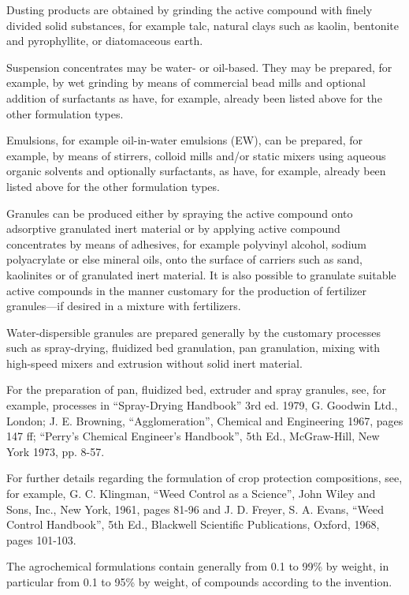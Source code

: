 \documentclass[11pt,a4paper]{article}
\begin{document}
Dusting products are obtained by grinding the active compound with finely divided solid substances, for example talc, natural clays such as kaolin, bentonite and pyrophyllite, or diatomaceous earth.

Suspension concentrates may be water- or oil-based. They may be prepared, for example, by wet grinding by means of commercial bead mills and optional addition of surfactants as have, for example, already been listed above for the other formulation types.

Emulsions, for example oil-in-water emulsions (EW), can be prepared, for example, by means of stirrers, colloid mills and/or static mixers using aqueous organic solvents and optionally surfactants, as have, for example, already been listed above for the other formulation types.

Granules can be produced either by spraying the active compound onto adsorptive granulated inert material or by applying active compound concentrates by means of adhesives, for example polyvinyl alcohol, sodium polyacrylate or else mineral oils, onto the surface of carriers such as sand, kaolinites or of granulated inert material. It is also possible to granulate suitable active compounds in the manner customary for the production of fertilizer granules—if desired in a mixture with fertilizers.

Water-dispersible granules are prepared generally by the customary processes such as spray-drying, fluidized bed granulation, pan granulation, mixing with high-speed mixers and extrusion without solid inert material.

For the preparation of pan, fluidized bed, extruder and spray granules, see, for example, processes in “Spray-Drying Handbook” 3rd ed. 1979, G. Goodwin Ltd., London; J. E. Browning, “Agglomeration”, Chemical and Engineering 1967, pages 147 ff; “Perry's Chemical Engineer's Handbook”, 5th Ed., McGraw-Hill, New York 1973, pp. 8-57.

For further details regarding the formulation of crop protection compositions, see, for example, G. C. Klingman, “Weed Control as a Science”, John Wiley and Sons, Inc., New York, 1961, pages 81-96 and J. D. Freyer, S. A. Evans, “Weed Control Handbook”, 5th Ed., Blackwell Scientific Publications, Oxford, 1968, pages 101-103.

The agrochemical formulations contain generally from 0.1 to 99\% by weight, in particular from 0.1 to 95\% by weight, of compounds according to the invention.
\end{document}
